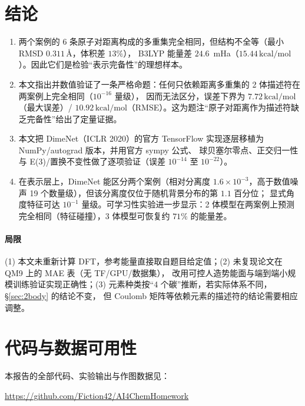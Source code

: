 \documentclass[UTF8,a4paper,11pt]{ctexart}
\newcommand{\kcal}{\,\mathrm{kcal/mol}}
\newcommand{\ang}{\,\text{\AA}}
\begin{document}
\section{结论}
\begin{enumerate}[leftmargin=1.6em,itemsep=2pt]
\item 两个案例的 6 条原子对距离构成的多重集完全相同，但结构不全等（最小 RMSD $0.311\ang$，体积差 $13\%$），
      B3LYP 能量差 $24.6$~mHa（$15.44\kcal$）。因此它们是检验“表示完备性”的理想样本。
\item 本文指出并数值验证了一条严格命题：任何只依赖距离多重集的 2 体描述符在两案例上完全相同（$10^{-16}$ 量级），
      因而无法区分，误差下界为 $7.72\kcal$（最大误差）/ $10.92\kcal$（RMSE）。这为题注“原子对距离作为描述符缺乏完备性”给出了定量证据。
\item 本文把 DimeNet（ICLR 2020）的官方 TensorFlow 实现逐层移植为 NumPy/autograd 版本，并用官方 sympy 公式、
      球贝塞尔零点、正交归一性与 E(3)/置换不变性做了逐项验证（误差 $10^{-14}$ 至 $10^{-22}$）。
\item 在表示层上，DimeNet 能区分两个案例（相对分离度 $1.6\times10^{-3}$，高于数值噪声 19 个数量级），但该分离度仅位于随机背景分布的第 $1.1$ 百分位；
      显式角度特征可达 $10^{-1}$ 量级。可学习性实验进一步显示：2 体模型在两案例上预测完全相同（特征碰撞），3 体模型可恢复约 $71\%$ 的能量差。
\end{enumerate}

\paragraph{局限}
(1) 本文未重新计算 DFT，参考能量直接取自题目给定值；(2) 未复现论文在 QM9 上的 MAE 表（无 TF/GPU/数据集），
改用可控人造势能面与端到端小规模训练验证实现正确性；(3) 元素种类按“4 个碳”推断，若实际体系不同，\S\ref{sec:2body} 的结论不变，
但 Coulomb 矩阵等依赖元素的描述符的结论需要相应调整。

\section{代码与数据可用性}
本报告的全部代码、实验输出与作图数据见：
\begin{center}
\url{https://github.com/Fiction42/AI4ChemHomework}
\end{center}
\end{document}

